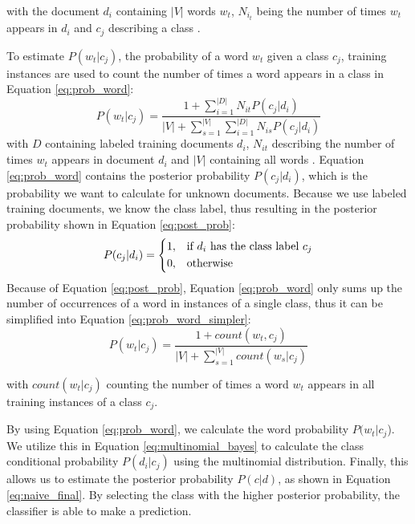         with the document $d_i$ containing $|V|$ words $w_t$, $N_{i_t}$ being the number of times $w_t$ appears in $d_i$ and $c_j$ describing a class \cite{Mccallum1998}. 
        
        To estimate $P(w_t|c_j)$, the probability of a word $w_t$ given a class $c_j$, training instances are used to count the number of times a word appears in a class in Equation \eqref{eq:prob_word}:
        \begin{equation}
            \label{eq:prob_word}
                P(w_t|c_j) = \frac{1 + \sum_{i=1}^{|D|}N_{it} P(c_j|d_i)}{|V| + \sum_{s=1}^{|V|} \sum_{i=1}^{|D|}N_{is} P (c_j|d_i)} 
        \end{equation}
        with $D$ containing labeled training documents $d_i$, $N_{it}$ describing the number of times $w_t$ appears in document $d_i$ and $|V|$ containing all words \cite{Mccallum1998}.
        Equation \eqref{eq:prob_word} contains the posterior probability $P(c_j|d_i)$, which is the probability we want to calculate for unknown documents. Because we use labeled training documents, we know the class label, thus resulting in the posterior probability shown in Equation \eqref{eq:post_prob}:
        \begin{equation}
                \label{eq:post_prob}
                P(c_j|d_i)= 
                \begin{dcases}
                1,& \text{if } d_i \text{ has the class label } c_j \\
                0,              & \text{otherwise}
        \end{dcases}
        \end{equation}
        Because of Equation \eqref{eq:post_prob}, Equation \eqref{eq:prob_word} only sums up the number of occurrences of a word in instances of a single class, thus it can be simplified into Equation \eqref{eq:prob_word_simpler}:
                \begin{equation}
            \label{eq:prob_word_simpler}
                P(w_t|c_j) = \frac{1 + count(w_t, c_j)}{|V| + \sum_{s=1}^{|V|}count(w_s|c_j)} 
        \end{equation}

        with $count(w_t|c_j)$ counting the number of times a word $w_t$ appears in all training instances of a class $c_j$.
        
        By using Equation \eqref{eq:prob_word}, we calculate the word probability $P(w_t|c_j$). We utilize this in Equation \eqref{eq:multinomial_bayes} to calculate the class conditional probability $P(d_i|c_j)$ using the multinomial distribution. Finally, this allows us to estimate the posterior probability $P(c|d)$, as shown in Equation \eqref{eq:naive_final}. By selecting the class with the higher posterior probability, the classifier is able to make a prediction.
        
